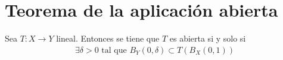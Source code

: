 
\section{Teorema de la aplicación abierta}

\begin{ejercicio}
    Sea $T:X\to Y$ lineal. Entonces se tiene que $T$ es abierta si y solo si
    \begin{gather*}
        \exists \delta>0 \text{ tal que } B_Y(0,\delta) \subset T(B_X(0,1))
    \end{gather*}
\end{ejercicio}

